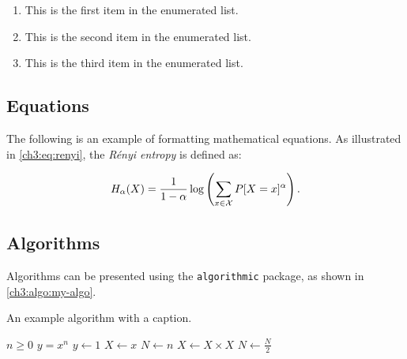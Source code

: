 \begin{enumerate}[itemindent=\subsubparitemindent]
    \item This is the first item in the enumerated list.
    \item This is the second item in the enumerated list.
    \item This is the third item in the enumerated list.
\end{enumerate}

\subsection{Equations}
\begin{subparagraph}
The following is an example of formatting mathematical equations. As illustrated in \autoref{ch3:eq:renyi}, the {\em R\'enyi entropy} is defined as:
\end{subparagraph}

\begin{equation}
\label{ch3:eq:renyi}
H_{\alpha}(X) =
\frac{1}{1-\alpha}
\log \left(\sum_{x \in {\cal X}}P[X=x]^{\alpha} \right) .
\end{equation}

\subsection{Algorithms}
\begin{subparagraph}
Algorithms can be presented using the \texttt{algorithmic} package, as shown in \autoref{ch3:algo:my-algo}.
\end{subparagraph}

\begin{algorithm}[h]
\caption{An example algorithm with a caption.}
\label{ch3:algo:my-algo}
\normalsize\singlespacing
\begin{algorithmic}[1]
    \Require $n \geq 0$
    \Ensure $y = x^n$
    \State $y \gets 1$
    \State $X \gets x$
    \State $N \gets n$
            \State $X \gets X \times X$
            \State $N \gets \frac{N}{2}$ 
    \EndWhile
\end{algorithmic}
\end{algorithm}

